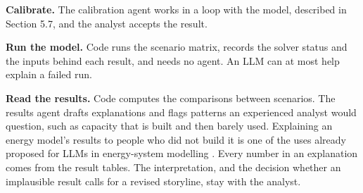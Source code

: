 \textbf{Calibrate.} The calibration agent works in a loop with the model, described in Section 5.7, and the analyst accepts the result.

\textbf{Run the model.} Code runs the scenario matrix, records the solver status and the inputs behind each result, and needs no agent.
An LLM can at most help explain a failed run.

\textbf{Read the results.} Code computes the comparisons between scenarios.
The results agent drafts explanations and flags patterns an experienced analyst would question, such as capacity that is built and then barely used.
Explaining an energy model's results to people who did not build it is one of the uses already proposed for LLMs in energy-system modelling \citep{forootani2025re}.
Every number in an explanation comes from the result tables.
The interpretation, and the decision whether an implausible result calls for a revised storyline, stay with the analyst.
